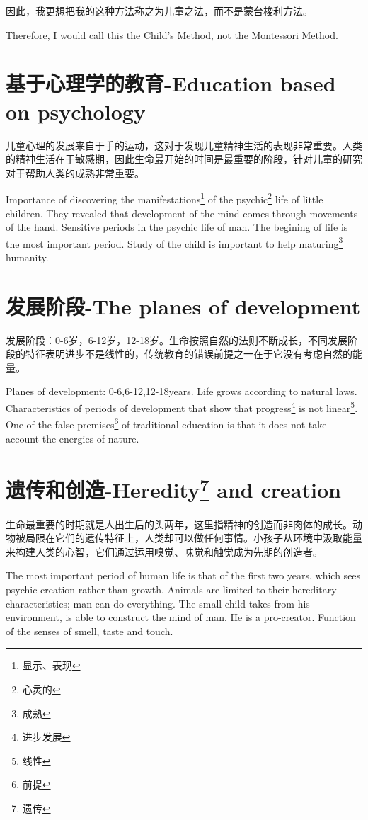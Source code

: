 \documentclass[lang=cn,10pt]{elegantbook}
\begin{document}
因此，我更想把我的这种方法称之为儿童之法，而不是蒙台梭利方法。

Therefore, I would call this the Child's Method, not the Montessori Method.

\chapter{基于心理学的教育-Education based on psychology}

儿童心理的发展来自于手的运动，这对于发现儿童精神生活的表现非常重要。人类的精神生活在于敏感期，因此生命最开始的时间是最重要的阶段，针对儿童的研究对于帮助人类的成熟非常重要。

Importance of discovering the manifestations\footnote{显示、表现} of the psychic\footnote{心灵的} life of little children. They revealed that development of the mind comes through movements of the hand. Sensitive periods in the psychic life of man. The begining of life is the most important period. Study of the child is important to help maturing\footnote{成熟} humanity.

\chapter{发展阶段-The planes of development}

发展阶段：0-6岁，6-12岁，12-18岁。生命按照自然的法则不断成长，不同发展阶段的特征表明进步不是线性的，传统教育的错误前提之一在于它没有考虑自然的能量。

Planes of development: 0-6,6-12,12-18years. Life grows according to natural laws. Characteristics of periods of development that show that progress\footnote{进步发展} is not linear\footnote{线性}. One of the false premises\footnote{前提} of traditional education is that it does not take account the energies of nature.

\chapter{遗传和创造-Heredity\footnote{遗传} and creation}

生命最重要的时期就是人出生后的头两年，这里指精神的创造而非肉体的成长。动物被局限在它们的遗传特征上，人类却可以做任何事情。小孩子从环境中汲取能量来构建人类的心智，它们通过运用嗅觉、味觉和触觉成为先期的创造者。

The most important period of human life is that of the first two years, which sees psychic creation rather than growth. Animals are limited to their hereditary characteristics; man can do everything. The small child takes from his environment, is able to construct the mind of man. He is a pro-creator. Function of the senses of smell, taste and touch.
\end{document}
